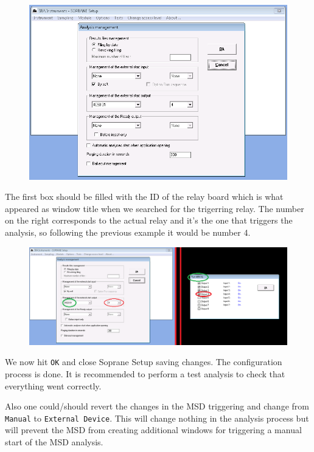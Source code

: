 \documentclass[31pt]{article}
\begin{document}
\begin{figure}[h]
\centering
\includegraphics[width=.9\textwidth]{10ConfigureTrigger.png}
\label{fig:univerise}
\end{figure}

\newpage

The first box should be filled with the ID of the relay board which is what appeared as window title when we searched for the trigerring relay. The number on the right corresponds to the actual relay and it's the one that triggers the analysis, so following the previous example it would be number 4.

\begin{figure}[h]
\centering
\includegraphics[width=1.2\textwidth]{11CorrectOptions.png}
\label{fig:univerise}
\end{figure}


We now hit \texttt{OK} and close Soprane Setup saving changes. The configuration process is done. It is recommended to perform a test analysis to check that everything went correctly.

Also one could/should revert the changes in the MSD triggering and change from \texttt{Manual} to \texttt{External Device}. This will change nothing in the analysis process but will prevent the MSD from creating additional windows for triggering a manual start of the MSD analysis.
\end{document}
